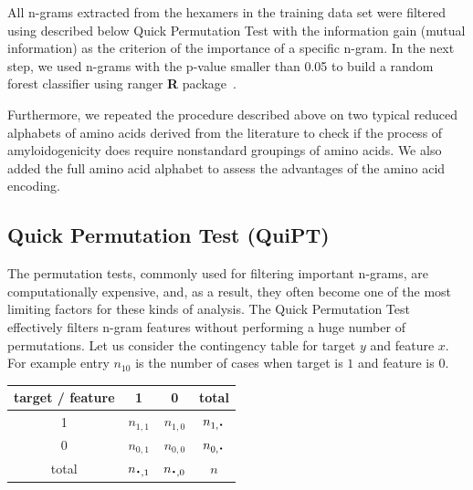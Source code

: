 \documentclass[a4,center,fleqn]{NAR}
\newcommand*{\bigcdot}{\raisebox{-0.25ex}{\scalebox{1.5}{$\cdot$}}}
\begin{document}
  All n-grams extracted from the hexamers in the training data set were filtered 
using described below Quick Permutation Test with the information gain (mutual 
information) as the criterion of the importance of a specific n-gram. In the 
next step, we used n-grams with the p-value smaller than 0.05 to build a random 
forest classifier using ranger \textbf{R} package~\citep{wright_ranger:_2015}. 

  Furthermore, we repeated the procedure described above on two typical reduced 
alphabets of amino acids derived from the literature to check if the process of 
%
%
%
%
%
amyloidogenicity does require nonstandard groupings of amino acids. We also 
added the full amino acid alphabet to assess the advantages of the amino acid 
encoding.

\subsection{Quick Permutation Test (QuiPT)}

The permutation tests, commonly used for filtering important n-grams, are 
computationally expensive, and, as a result, they often become one of the most
limiting factors for these kinds of analysis. 
The Quick Permutation Test effectively filters 
n-gram features without performing a huge number of permutations. Let us 
consider the contingency table for target $y$ and feature $x$. For example 
entry $n_{10}$ is the number of cases when target is $1$ and feature is $0$.

\begin{center}
\begin{tabular}{ | c || c | c | c | }
  \hline			
  target / feature & 1 & 0 & total\\ \hline
 1 & $n_{1,1}$ & $n_{1,0}$ & $n_{1,\bigcdot}$ \\
 0 & $n_{0,1}$ & $n_{0,0}$ & $n_{0,\bigcdot}$ \\ \hline
 total & $n_{\bigcdot,1}$ & $n_{\bigcdot,0}$ & $n$ \\
  \hline  
\end{tabular} 
\end{center}
\end{document}
